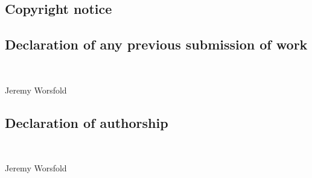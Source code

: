 {\subsection*{Copyright notice}
{\@standardcopyright}

\vfill

\subsection*{Declaration of any previous submission of work}
{\@restriction}\\[1.2\baselineskip]
\signature{Author's signature}{Jeremy Worsfold}

\vfill

\subsection*{Declaration of authorship}
{\@declarationofauthorship}\\[1.2\baselineskip]
\signature{Author's signature}{Jeremy Worsfold}

\vfill

\@copyrightpageafter


\par\kern 0pt\null
\clearpage
}
\makeatother